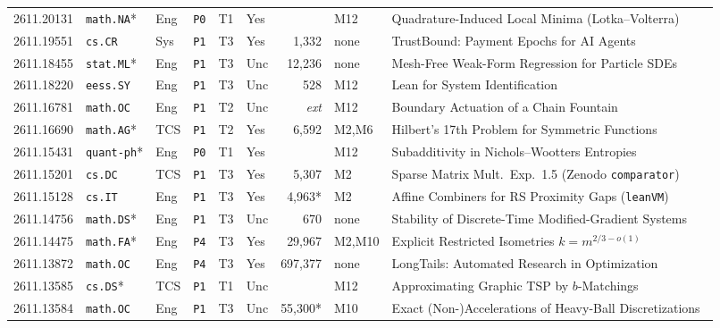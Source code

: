 \documentclass[11pt,letterpaper]{article}
\begin{document}
\begin{table}[p]
\begin{tabularx}{\textwidth}{llllllrlX}
2611.20131 & \texttt{math.NA}* & Eng & \texttt{P0} & T1 & Yes & \textemdash{} & M12 & Quadrature-Induced Local Minima (Lotka--Volterra)~\cite{arxiv2611_20131} \\
2611.19551 & \texttt{cs.CR} & Sys & \texttt{P1} & T3 & Yes & 1,332 & none & TrustBound: Payment Epochs for AI Agents~\cite{arxiv2611_19551} \\
2611.18455 & \texttt{stat.ML}* & Eng & \texttt{P1} & T3 & Unc & 12,236 & none & Mesh-Free Weak-Form Regression for Particle SDEs~\cite{arxiv2611_18455} \\
2611.18220 & \texttt{eess.SY} & Eng & \texttt{P1} & T3 & Unc & 528 & M12 & Lean for System Identification~\cite{arxiv2611_18220} \\
2611.16781 & \texttt{math.OC} & Eng & \texttt{P1} & T2 & Unc & \emph{ext} & M12 & Boundary Actuation of a Chain Fountain~\cite{arxiv2611_16781} \\
2611.16690 & \texttt{math.AG}* & TCS & \texttt{P1} & T2 & Yes & 6,592 & M2,M6 & Hilbert's 17th Problem for Symmetric Functions~\cite{arxiv2611_16690} \\
2611.15431 & \texttt{quant-ph}* & Eng & \texttt{P0} & T1 & Yes & \textemdash{} & M12 & Subadditivity in Nichols--Wootters Entropies~\cite{arxiv2611_15431} \\
2611.15201 & \texttt{cs.DC} & TCS & \texttt{P1} & T3 & Yes & 5,307 & M2 & Sparse Matrix Mult.\ Exp.\ 1.5 (Zenodo \texttt{comparator})~\cite{arxiv2611_15201} \\
2611.15128 & \texttt{cs.IT} & Eng & \texttt{P1} & T3 & Yes & 4,963* & M2 & Affine Combiners for RS Proximity Gaps (\texttt{leanVM})~\cite{arxiv2611_15128} \\
2611.14756 & \texttt{math.DS}* & Eng & \texttt{P1} & T3 & Unc & 670 & none & Stability of Discrete-Time Modified-Gradient Systems~\cite{arxiv2611_14756} \\
2611.14475 & \texttt{math.FA}* & Eng & \texttt{P4} & T3 & Yes & 29,967 & M2,M10 & Explicit Restricted Isometries $k=m^{2/3-o(1)}$~\cite{arxiv2611_14475} \\
2611.13872 & \texttt{math.OC} & Eng & \texttt{P4} & T3 & Yes & 697,377 & none & LongTails: Automated Research in Optimization~\cite{arxiv2611_13872} \\
2611.13585 & \texttt{cs.DS}* & TCS & \texttt{P1} & T1 & Unc & \textemdash{} & M12 & Approximating Graphic TSP by $b$-Matchings~\cite{arxiv2611_13585} \\
2611.13584 & \texttt{math.OC} & Eng & \texttt{P1} & T3 & Unc & 55,300* & M10 & Exact (Non-)Accelerations of Heavy-Ball Discretizations~\cite{arxiv2611_13584} \\

\end{tabularx}
\end{table}
\end{document}
